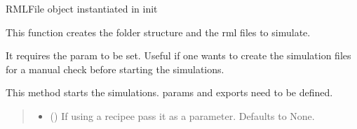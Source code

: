 \documentclass[letterpaper,10pt,english]{sphinxmanual}
\begin{document}
\begin{fulllineitems}
\begin{fulllineitems}
\label{\detokenize{API:raypyng.simulate.Simulate.rml}}
\pysigstartsignatures
{}
\pysigstopsignatures
\sphinxAtStartPar
RMLFile object instantiated in init

\end{fulllineitems}


\begin{fulllineitems}
\label{\detokenize{API:raypyng.simulate.Simulate.rml_list}}
\pysigstartsignatures
{}
\pysigstopsignatures
\sphinxAtStartPar
This function creates the folder structure and the rml files to simulate.

\sphinxAtStartPar
It requires the param to be set. Useful if one wants to create the simulation files
for a manual check before starting the simulations.

\end{fulllineitems}


\begin{fulllineitems}
\label{\detokenize{API:raypyng.simulate.Simulate.run}}
\pysigstartsignatures
{}
\pysigstopsignatures
\sphinxAtStartPar
This method starts the simulations. params and exports need to be defined.
\begin{quote}\begin{description}
\begin{itemize}
\item {} 
\sphinxAtStartPar
{} (\sphinxstyleliteralemphasis{\sphinxupquote{, }}) \textendash{} If using a recipee pass it as a parameter. Defaults to None.


\end{itemize}
\end{description}
\end{quote}
\end{fulllineitems}
\end{fulllineitems}
\end{document}
